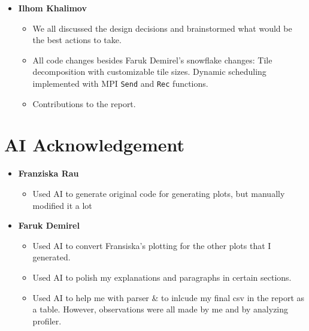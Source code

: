 \begin{itemize}
    \item \textbf{Ilhom Khalimov}
    \begin{itemize}
        \item We all discussed the design decisions and brainstormed what would be the best actions to take.
        \item All code changes besides Faruk Demirel's snowflake changes:
        \subitem Tile decomposition with customizable tile sizes.
        \subitem Dynamic scheduling implemented with MPI \texttt{Send} and \texttt{Rec} functions.
        \item Contributions to the report.
    \end{itemize}
\end{itemize}

\section{AI Acknowledgement}
\begin{itemize}
    \item \textbf{Franziska Rau}
    \begin{itemize}
        \item Used AI to generate original code for generating plots, but manually modified it a lot
    \end{itemize}
    \item \textbf{Faruk Demirel}
    \begin{itemize}
        \item Used AI to convert Fransiska's plotting for the other plots that I generated.
        \item Used AI to polish my explanations and paragraphs in certain sections.
        \item Used AI to help me with parser \& to inlcude my final csv in the report as a table. However, observations were all made by me and by analyzing profiler.

    \end{itemize}
\end{itemize}

